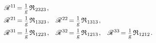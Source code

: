 \begin{otherlanguage}{russian}
\vspace{.1em}\begin{equation*}
\begin{array}{ccc}
\mathscr{R}^{\hspace{.1ex}1\hspace{-0.12ex}1} \hspace{-0.3ex} =
\scalebox{0.8}{$ \displaystyle \frac{\raisemath{-0.2em}{1}}{\raisemath{.15em}{\smash{\textsl{g}}}} $} \hspace{.4ex} \mathfrak{R}_{\hspace{.1ex}2323}
\hspace{.2ex} ,
&
&
\\[.6em]
%
\mathscr{R}^{\hspace{.1ex}21} \hspace{-0.3ex} =
\scalebox{0.8}{$ \displaystyle \frac{\raisemath{-0.2em}{1}}{\raisemath{.15em}{\smash{\textsl{g}}}} $} \hspace{.4ex} \mathfrak{R}_{\hspace{.1ex}1323}
\hspace{.2ex} ,
&
\mathscr{R}^{\hspace{.1ex}22} \hspace{-0.3ex} =
\scalebox{0.8}{$ \displaystyle \frac{\raisemath{-0.2em}{1}}{\raisemath{.15em}{\smash{\textsl{g}}}} $} \hspace{.4ex} \mathfrak{R}_{\hspace{.1ex}1313}
\hspace{.2ex} ,
&
\\[.6em]
%
\mathscr{R}^{\hspace{.1ex}31} \hspace{-0.3ex} =
\scalebox{0.8}{$ \displaystyle \frac{\raisemath{-0.2em}{1}}{\raisemath{.15em}{\smash{\textsl{g}}}} $} \hspace{.4ex} \mathfrak{R}_{\hspace{.1ex}1223}
\hspace{.2ex} ,
&
\mathscr{R}^{\hspace{.1ex}32} \hspace{-0.3ex} =
\scalebox{0.8}{$ \displaystyle \frac{\raisemath{-0.2em}{1}}{\raisemath{.15em}{\smash{\textsl{g}}}} $} \hspace{.4ex} \mathfrak{R}_{\hspace{.1ex}1213}
\hspace{.2ex} ,
&
\mathscr{R}^{\hspace{.1ex}33} \hspace{-0.3ex} =
\scalebox{0.8}{$ \displaystyle \frac{\raisemath{-0.2em}{1}}{\raisemath{.15em}{\smash{\textsl{g}}}} $} \hspace{.4ex} \mathfrak{R}_{\hspace{.1ex}1212}
\hspace{.2ex} .
\end{array}
\end{equation*}


\end{otherlanguage}
